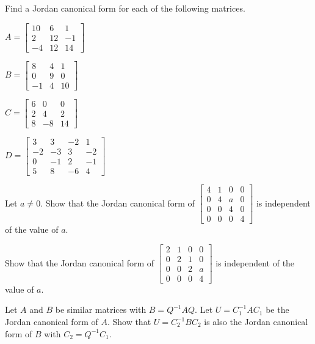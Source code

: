\label{sec:jordan_exer}
\be
\item Find a Jordan canonical form for each of the following matrices.
	\ba
	\item $A=\left[ \begin{array}{rcr} 10&6&1\\2&12&-1\\-4&12&14 \end{array} \right]$
	\item $B=\left[ \begin{array}{rcc} 8&4&1\\0&9&0\\-1&4&10 \end{array} \right]$
	\item $C=\left[ \begin{array}{crc} 6&0&0\\2&4&2\\8&-8&14 \end{array} \right]$
	\item $D=\left[ \begin{array}{rrrr} 3&3&-2&1\\-2&-3&3&-2\\0&-1&2&-1\\5&8&-6&4 \end{array} \right]$
	\ea
	
\item Let $a \neq 0$. Show that the Jordan canonical form of $\left[ \begin{array}{cccc} 4&1&0&0 \\ 0&4&a&0 \\ 0&0&4&0 \\ 0&0&0&4 \end{array} \right]$ is independent of the value of $a$. 

\item Show that the Jordan canonical form of $\left[ \begin{array}{cccc} 2&1&0&0 \\ 0&2&1&0 \\ 0&0&2&a \\ 0&0&0&4 \end{array} \right]$ is independent of the value of $a$. 

\item Let $A$ and $B$ be similar matrices with $B = Q^{-1}AQ$. Let $U = C_1^{-1}AC_1$ be the Jordan canonical form of $A$. Show that $U = C_2^{-1}BC_2$ is also the Jordan canonical form of $B$ with $C_2 = Q^{-1}C_1$. 

